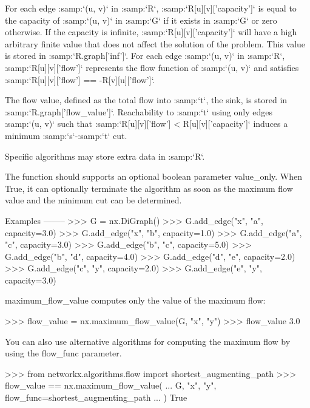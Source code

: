 \begin{DoxyVerb}
For each edge :samp:`(u, v)` in :samp:`R`, :samp:`R[u][v]['capacity']`
is equal to the capacity of :samp:`(u, v)` in :samp:`G` if it exists
in :samp:`G` or zero otherwise. If the capacity is infinite,
:samp:`R[u][v]['capacity']` will have a high arbitrary finite value
that does not affect the solution of the problem. This value is stored in
:samp:`R.graph['inf']`. For each edge :samp:`(u, v)` in :samp:`R`,
:samp:`R[u][v]['flow']` represents the flow function of :samp:`(u, v)` and
satisfies :samp:`R[u][v]['flow'] == -R[v][u]['flow']`.

The flow value, defined as the total flow into :samp:`t`, the sink, is
stored in :samp:`R.graph['flow_value']`. Reachability to :samp:`t` using
only edges :samp:`(u, v)` such that
:samp:`R[u][v]['flow'] < R[u][v]['capacity']` induces a minimum
:samp:`s`-:samp:`t` cut.

Specific algorithms may store extra data in :samp:`R`.

The function should supports an optional boolean parameter value_only. When
True, it can optionally terminate the algorithm as soon as the maximum flow
value and the minimum cut can be determined.

Examples
--------
>>> G = nx.DiGraph()
>>> G.add_edge("x", "a", capacity=3.0)
>>> G.add_edge("x", "b", capacity=1.0)
>>> G.add_edge("a", "c", capacity=3.0)
>>> G.add_edge("b", "c", capacity=5.0)
>>> G.add_edge("b", "d", capacity=4.0)
>>> G.add_edge("d", "e", capacity=2.0)
>>> G.add_edge("c", "y", capacity=2.0)
>>> G.add_edge("e", "y", capacity=3.0)

maximum_flow_value computes only the value of the
maximum flow:

>>> flow_value = nx.maximum_flow_value(G, "x", "y")
>>> flow_value
3.0

You can also use alternative algorithms for computing the
maximum flow by using the flow_func parameter.

>>> from networkx.algorithms.flow import shortest_augmenting_path
>>> flow_value == nx.maximum_flow_value(
...     G, "x", "y", flow_func=shortest_augmenting_path
... )
True\end{DoxyVerb}
 \mbox{\label{namespacenetworkx_1_1algorithms_1_1flow_1_1maxflow_a2b42167cf296bb43dbd57f17926db3fc}} 
